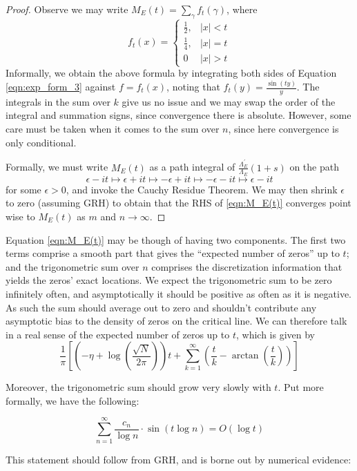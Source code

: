 \documentclass[10pt]{article}
\newcommand{\pr}{^{\prime}}
\newcommand{\ldLam}[1]{\frac{\Lambda_E\pr}{\Lambda_E}\left(#1\right)}
\begin{document}
\begin{proof}
Observe we may write $M_E(t) = \sum_{\gamma}f_t(\gamma)$, where
\begin{equation}
f_t(x) = \begin{cases} \frac{1}{2}, & |x|<t \\ \frac{1}{4}, & |x| = t \\ 0 & |x|> t \end{cases}
\end{equation}
Informally, we obtain the above formula by integrating both sides of Equation \ref{eqn:exp_form_3} against $f = f_t(x)$, noting that $\hat{f}_t(y) = \frac{\sin(ty)}{y}$. The integrals in the sum over $k$ give us no issue and we may swap the order of the integral and summation signs, since convergence there is absolute. However, some care must be taken when it comes to the sum over $n$, since here convergence is only conditional. 

Formally, we must write $M_E(t)$ as a path integral of $\ldLam{1+s}$ on the path
\begin{equation*}
\epsilon-it \mapsto \epsilon+it \mapsto -\epsilon+it \mapsto -\epsilon-it \mapsto \epsilon-it
\end{equation*}
for some $\epsilon>0$, and invoke the Cauchy Residue Theorem. We may then shrink $\epsilon$ to zero (assuming GRH) to obtain that the RHS of \ref{eqn:M_E(t)} converges point wise to $M_E(t)$ as $m$ and $n \to \infty$.
\end{proof}

Equation \ref{eqn:M_E(t)} may be though of having two components. The first two terms comprise a smooth part that gives the ``expected number of zeros'' up to $t$; and the trigonometric sum over $n$ comprises the discretization information that yields the zeros' exact locations. We expect the trigonometric sum to be zero infinitely often, and asymptotically it should be positive as often as it is negative. As such the sum should average out to zero and shouldn't contribute any asymptotic bias to the density of zeros on the critical line. We can therefore talk in a real sense of the expected number of zeros up to $t$, which is given by
\begin{equation}\label{eqn:M_E_smooth_part}
\frac{1}{\pi}\left[\left(-\eta+\log\left(\frac{\sqrt{N}}{2\pi}\right)\right) t + \sum_{k=1}^{\infty} \left(\frac{t}{k} - \arctan\left(\frac{t}{k}\right)\right)\right]
\end{equation}

Moreover, the trigonometric sum should grow very slowly with $t$. Put more formally, we have the following:
\begin{conjecture}\label{conj:trig_sum_size}
\begin{equation}
\sum_{n=1}^{\infty} \frac{c_n}{\log n}\cdot \sin(t\log n) = O(\log t)
\end{equation}
\end{conjecture}
This statement should follow from GRH, and is borne out by numerical evidence:
\end{document}
